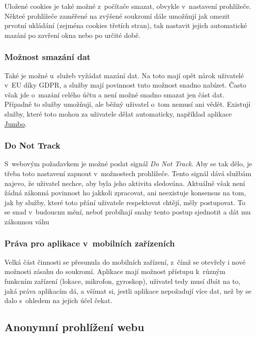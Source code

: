 Uložené cookies je také možné z~počítače smazat, obvykle v~nastavení prohlížeče. Někteé prohlížeče zaměřené na zvýšené soukromí dále umožňují jak omezit prvotní ukládání (zejména cookies třetích stran), tak nastavit jejich automatické mazání po zavření okna nebo po určité době.

\subsubsection*{Možnost smazání dat}
Také je možné u~služeb vyžádat mazání dat. Na toto mají opět nárok uživatelé v~EU díky GDPR, a služby mají povinnost tuto možnost snadno nabízet. Často však jde o~mazání celého účtu a není možné snadno smazat jen část dat. Případně to služby umožňují, ale běžný uživatel o~tom nemusí ani vědět. Existují služby, které toto mohou za uživatele dělat automaticky, například aplikace \href{https://www.jumboprivacy.com}{Jumbo}. 

\subsubsection*{Do Not Track}
S~webovým požadavkem je možné poslat signál \textit{Do Not Track}. Aby se tak dělo, je třeba toto nastavení zapnout v~možnostech prohlížeče. Tento signál dává službám najevo, že uživatel nechce, aby byla jeho aktivita sledována. Aktuálně však není žádná zákonná povinnost ho jakkoli zpracovat, ani neexistuje konsensus na tom, jak by služby, které toto přání uživatele respektovat chtějí, měly postupovat. To se snad v~budoucnu mění, neboť probíhají snahy tento postup sjednotit a dát mu zákonnou váhu \citep{do-not-track-future}

\subsubsection*{Práva pro aplikace v~mobilních zařízeních}
Velká část činnosti se přesunula do mobilních zařízení, z~čímž se otevřely i nové možnosti zásahu do soukromí. Aplikace mají možnost přístupu k~různým funkcním zařízení (lokace, mikrofon, gyroskop), uživatel tedy musí dbát na to, jaká práva aplikacím dá, a všímat si, jestli aplikace nepožadují více dat, než by se dalo s~ohledem na jejich účel čekat.

\subsection{Anonymní prohlížení webu}

